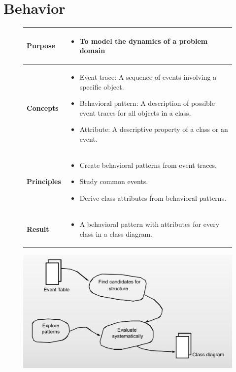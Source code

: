 \chapter{Behavior \ooad[91]}\label{chapter:behavior}
\begin{figure}[H]
    \begin{tabular}{|l|p{12cm}|}
        \hline
        \textbf{Purpose} & \begin{itemize}
            \item To model the dynamics of a problem domain
        \end{itemize} \\\hline
        \textbf{Concepts} & \begin{itemize}
            \item Event trace: A sequence of events involving a specific object.
            \item Behavioral pattern: A description of possible event traces for all objects in a class.
            \item Attribute: A descriptive property of a class or an event.
        \end{itemize} \\\hline
        \textbf{Principles} & \begin{itemize}
            \item Create behavioral patterns from event traces.
            \item Study common events.
            \item Derive class attributes from behavioral patterns.
        \end{itemize} \\\hline
        \textbf{Result} & \begin{itemize}
            \item A behavioral pattern with attributes for every class in a class diagram.
        \end{itemize} \\\hline
    \end{tabular}
\end{figure}

\begin{figure}[H]
    \centering
    \includegraphics*[width=\linewidth]{parts/2_problem_domain_analysis/behavior/figures/structure_activity.png}
\end{figure}

